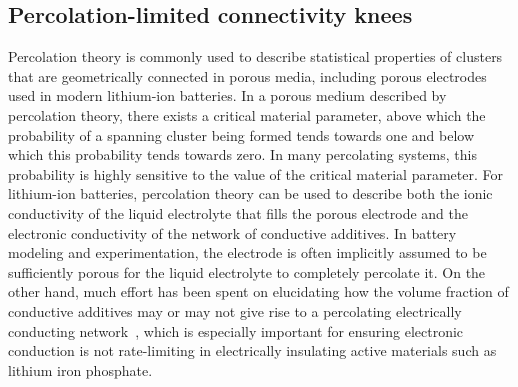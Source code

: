 \documentclass[journal=jpcl, manuscript=article, layout=onecolumn]{achemso}
\begin{document}
\subsection{Percolation-limited connectivity knees}

Percolation theory \cite{essam_percolation_1980, stauffer_introduction_1994} is commonly used to describe statistical properties of clusters that are geometrically connected in porous media, including porous electrodes used in modern lithium-ion batteries\cite{ferguson_nonequilibrium_2012}. In a porous medium described by percolation theory, there exists a critical material parameter, above which the probability of a spanning cluster being formed tends towards one and below which this probability tends towards zero.\cite{ferguson_nonequilibrium_2012} In many percolating systems, this probability is highly sensitive to the value of the critical material parameter. For lithium-ion batteries, percolation theory can be used to describe both the ionic conductivity of the liquid electrolyte that fills the porous electrode and the electronic conductivity of the network of conductive additives. In battery modeling and experimentation, the electrode is often implicitly assumed to be sufficiently porous for the liquid electrolyte to completely percolate it. On the other hand, much effort has been spent on elucidating how the volume fraction of conductive additives may or may not give rise to a percolating electrically conducting network~\cite{chen_selection_2007, li_effects_2015, cerbelaud_understanding_2015, guzman_improved_2017}, which is especially important for ensuring electronic conduction is not rate-limiting in electrically insulating active materials such as lithium iron phosphate.\cite{li_effects_2015, guzman_improved_2017}
\end{document}
